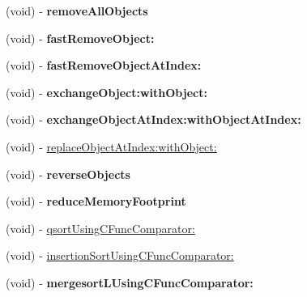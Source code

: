 \begin{DoxyCompactItemize}
\item 
\hypertarget{interface_c_c_array_a62b3f75d7c732079848d34b7b11891be}{(void) -\/ {\bfseries remove\-All\-Objects}}\label{interface_c_c_array_a62b3f75d7c732079848d34b7b11891be}

\item 
\hypertarget{interface_c_c_array_a9df0a6fc4ac0e3e869d115425ca97949}{(void) -\/ {\bfseries fast\-Remove\-Object\-:}}\label{interface_c_c_array_a9df0a6fc4ac0e3e869d115425ca97949}

\item 
\hypertarget{interface_c_c_array_a74590816ee5b38b4806e788e82c4e2ce}{(void) -\/ {\bfseries fast\-Remove\-Object\-At\-Index\-:}}\label{interface_c_c_array_a74590816ee5b38b4806e788e82c4e2ce}

\item 
\hypertarget{interface_c_c_array_afb9f18cfaee57d19c0a498564d6e0412}{(void) -\/ {\bfseries exchange\-Object\-:with\-Object\-:}}\label{interface_c_c_array_afb9f18cfaee57d19c0a498564d6e0412}

\item 
\hypertarget{interface_c_c_array_ac4555a663534323fefbfcf2e0a4777d6}{(void) -\/ {\bfseries exchange\-Object\-At\-Index\-:with\-Object\-At\-Index\-:}}\label{interface_c_c_array_ac4555a663534323fefbfcf2e0a4777d6}

\item 
(void) -\/ \hyperlink{interface_c_c_array_a41929aff19adb31bb00bb288b70468d6}{replace\-Object\-At\-Index\-:with\-Object\-:}
\item 
\hypertarget{interface_c_c_array_a32a577bec59d31a4583c4f7436f130e3}{(void) -\/ {\bfseries reverse\-Objects}}\label{interface_c_c_array_a32a577bec59d31a4583c4f7436f130e3}

\item 
\hypertarget{interface_c_c_array_a6a489f390db868675cab5729e4ffc1a3}{(void) -\/ {\bfseries reduce\-Memory\-Footprint}}\label{interface_c_c_array_a6a489f390db868675cab5729e4ffc1a3}

\item 
(void) -\/ \hyperlink{interface_c_c_array_acf489832279df62d4052561505cad696}{qsort\-Using\-C\-Func\-Comparator\-:}
\item 
(void) -\/ \hyperlink{interface_c_c_array_a61e89ce807d7a3d71a7ab822ee78f4c9}{insertion\-Sort\-Using\-C\-Func\-Comparator\-:}
\item 
\hypertarget{interface_c_c_array_a35e642cdd8c95f42aed150a70e27a06b}{(void) -\/ {\bfseries mergesort\-L\-Using\-C\-Func\-Comparator\-:}}\label{interface_c_c_array_a35e642cdd8c95f42aed150a70e27a06b}


\end{DoxyCompactItemize}

